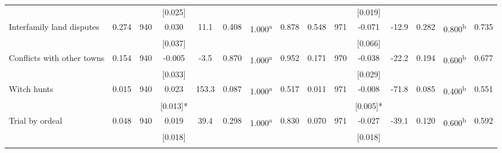 \begin{tabular}{lcccccccccccccc}
 &  &  & [0.025] &  &  &  &  &  &  & [0.019] &  &  &  & \\
\quad Interfamily land disputes & 0.274 & 940 & 0.030 & 11.1 & 0.408 & 1.000\textsuperscript{a} & 0.878 & 0.548 & 971 & -0.071 & -12.9 & 0.282 & 0.800\textsuperscript{b} & 0.735\\
 &  &  & [0.037] &  &  &  &  &  &  & [0.066] &  &  &  & \\
\quad Conflicts with other towns & 0.154 & 940 & -0.005 & -3.5 & 0.870 & 1.000\textsuperscript{a} & 0.952 & 0.171 & 970 & -0.038 & -22.2 & 0.194 & 0.600\textsuperscript{b} & 0.677\\
 &  &  & [0.033] &  &  &  &  &  &  & [0.029] &  &  &  & \\
\quad Witch hunts & 0.015 & 940 & 0.023 & 153.3 & 0.087 & 1.000\textsuperscript{a} & 0.517 & 0.011 & 971 & -0.008 & -71.8 & 0.085 & 0.400\textsuperscript{b} & 0.551\\
 &  &  & [0.013]* &  &  &  &  &  &  & [0.005]* &  &  &  & \\
\quad Trial by ordeal & 0.048 & 940 & 0.019 & 39.4 & 0.298 & 1.000\textsuperscript{a} & 0.830 & 0.070 & 971 & -0.027 & -39.1 & 0.120 & 0.600\textsuperscript{b} & 0.592\\
 &  &  & [0.018] &  &  &  &  &  &  & [0.018] &  &  &  & \\
\noalign{\smallskip}\hline\end{tabular}
